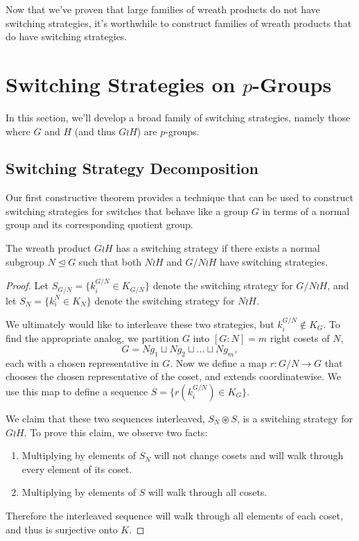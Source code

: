 Now that we've proven that large families of wreath products do not have
switching strategies, it's worthwhile to construct families of wreath products
that do have switching strategies.
%
%
\section{Switching Strategies on \texorpdfstring{$p$}{p}-Groups}
\label{sec:pGroupStrategy}
In this section, we'll develop a broad family of switching strategies,
namely those where $G$ and $H$ (and thus $G \wr H$) are $p$-groups.
\subsection{Switching Strategy Decomposition}

Our first constructive theorem provides a technique that can be used to
construct switching strategies for switches that behave like a group $G$ in
terms of a normal group and its corresponding quotient group.
\begin{theorem}
  The wreath product $G \wr H$ has a switching strategy if there exists a
  normal subgroup $N \trianglelefteq G$ such that both $N \wr H$ and
  $G/N \wr H$ have switching strategies.
\label{thm:switchingStrategyDecomposition}
\end{theorem}
\begin{proof}
  Let $S_{G/N} = \{k_i^{G/N} \in K_{G/N}\}$ denote the switching strategy for
  $G/N \wr H$, and
  let $S_{N} = \{k_i^N \in K_{N}\}$ denote the switching strategy for $N \wr H$.

  We ultimately would like to interleave these two strategies,
  but $k_i^{G/N} \not\in K_G$. To find the appropriate analog,
  we partition $G$ into $[G : N] = m$ right cosets of $N$, \[
    G = Ng_1 \sqcup Ng_2 \sqcup \dots \sqcup Ng_m,
  \] each with a chosen representative in $G$.
  Now we define a map $r \colon G/N \rightarrow G$ that chooses the chosen
  representative of the coset, and extends coordinatewise. We use this map to
  define a sequence $S = \{r(k_i^{G/N}) \in K_G\}$.

  We claim that these two sequences interleaved, $S_N \circledast S$, is a
  switching strategy for $G \wr H$. To prove this claim, we observe two facts:
  \begin{enumerate}
    \item Multiplying by elements of $S_N$ will not change cosets and will walk
    through every element of its coset.
    \item Multiplying by elements of $S$ will walk through all cosets.
  \end{enumerate}
  Therefore the interleaved sequence will walk through all elements of each
  coset, and thus is surjective onto $K$.
\end{proof}

